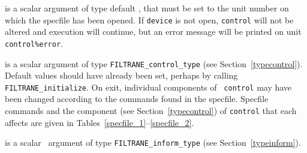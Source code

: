\documentclass{galahad}
\newcommand{\packagename}{FILTRANE}
\begin{document}
\begin{description}
 is a scalar \intentin argument of type default \integer,
that must be set to the unit number on which the specfile
has been opened. If {\tt device} is not open, {\tt control} will
not be altered and execution will continue, but an error message
will be printed on unit {\tt control\%error}.

 is a scalar \intentinout argument of type 
{\tt \packagename\_control\_type} (see Section~\ref{typecontrol}). 
Default values should have already been set, perhaps by calling 
{\tt \packagename\_initialize}. On exit, individual components of {\tt
control} may have been changed according to the commands found in the
specfile. Specfile commands and  the component (see Section~\ref{typecontrol})
of {\tt control}  that each affects are given in
Tables~\ref{specfile_1}--\ref{specfile_2}.

 is a scalar \intentout\ argument of type 
{\tt \packagename\_inform\_type} (see Section~\ref{typeinform}).
\end{description}
\end{document}

